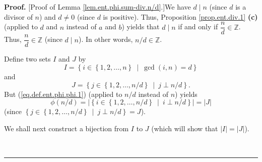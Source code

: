\documentclass[numbers=enddot,12pt,final,onecolumn,notitlepage]{scrartcl}%
\numberwithin{exer}{subsection}
\theoremstyle{definition}
\newenvironment{proof}[1][Proof]{\noindent\textbf{#1.} }{\ \rule{0.5em}{0.5em}}
\begin{document}
\begin{proof}
[Proof of Lemma \ref{lem.ent.phi.sum-div.n/d}.]We have $d\mid n$ (since $d$ is
a divisor of $n$) and $d\neq0$ (since $d$ is positive). Thus, Proposition
\ref{prop.ent.div.1} \textbf{(c)} (applied to $d$ and $n$ instead of $a$ and
$b$) yields that $d\mid n$ if and only if $\dfrac{n}{d}\in\mathbb{Z}$. Thus,
$\dfrac{n}{d}\in\mathbb{Z}$ (since $d\mid n$). In other words, $n/d\in
\mathbb{Z}$.

Define two sets $I$ and $J$ by%
\begin{equation}
I=\left\{  i\in\left\{  1,2,\ldots,n\right\}  \ \mid\ \gcd\left(  i,n\right)
=d\right\}  \label{pf.lem.ent.phi.sum-div.n/d.I=}%
\end{equation}
and%
\begin{equation}
J=\left\{  j\in\left\{  1,2,\ldots,n/d\right\}  \ \mid\ j\perp n/d\right\}  .
\label{pf.lem.ent.phi.sum-div.n/d.J=}%
\end{equation}
But (\ref{eq.def.ent.phi.phi.1}) (applied to $n/d$ instead of $n$) yields%
\begin{equation}
\phi\left(  n/d\right)  =\left\vert \left\{  i\in\left\{  1,2,\ldots
,n/d\right\}  \ \mid\ i\perp n/d\right\}  \right\vert =\left\vert J\right\vert
\label{pf.lem.ent.phi.sum-div.n/d.2}%
\end{equation}
(since $\left\{  j\in\left\{  1,2,\ldots,n/d\right\}  \ \mid\ j\perp
n/d\right\}  =J$).

We shall next construct a bijection from $I$ to $J$ (which will show that
$\left\vert I\right\vert =\left\vert J\right\vert $).


\end{proof}
\end{document}
